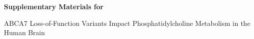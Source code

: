 \begin{titlepage}
    \centering
    {\Large \bfseries Supplementary Materials for\par}
    \vspace{1em}
    {\large ABCA7 Loss-of-Function Variants Impact Phosphatidylcholine Metabolism in the Human Brain\par}
    \vfill
\end{titlepage}
